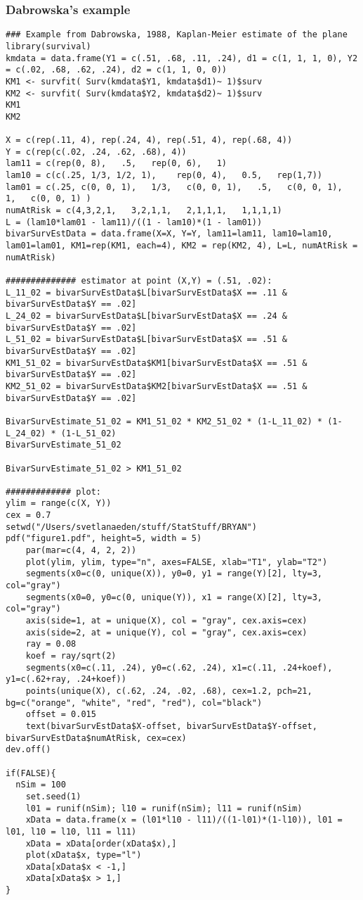 \documentclass[]{article}
\begin{document}
\subsubsection{Dabrowska's example}
{{\tiny
\begin{verbatim}
### Example from Dabrowska, 1988, Kaplan-Meier estimate of the plane
library(survival)
kmdata = data.frame(Y1 = c(.51, .68, .11, .24), d1 = c(1, 1, 1, 0), Y2 = c(.02, .68, .62, .24), d2 = c(1, 1, 0, 0))
KM1 <- survfit( Surv(kmdata$Y1, kmdata$d1)~ 1)$surv
KM2 <- survfit( Surv(kmdata$Y2, kmdata$d2)~ 1)$surv
KM1
KM2

X = c(rep(.11, 4), rep(.24, 4), rep(.51, 4), rep(.68, 4))
Y = c(rep(c(.02, .24, .62, .68), 4))
lam11 = c(rep(0, 8),   .5,   rep(0, 6),   1)
lam10 = c(c(.25, 1/3, 1/2, 1),    rep(0, 4),   0.5,   rep(1,7))
lam01 = c(.25, c(0, 0, 1),   1/3,   c(0, 0, 1),   .5,   c(0, 0, 1),   1,   c(0, 0, 1) )
numAtRisk = c(4,3,2,1,   3,2,1,1,   2,1,1,1,   1,1,1,1)
L = (lam10*lam01 - lam11)/((1 - lam10)*(1 - lam01))
bivarSurvEstData = data.frame(X=X, Y=Y, lam11=lam11, lam10=lam10, lam01=lam01, KM1=rep(KM1, each=4), KM2 = rep(KM2, 4), L=L, numAtRisk = numAtRisk)

############## estimator at point (X,Y) = (.51, .02):
L_11_02 = bivarSurvEstData$L[bivarSurvEstData$X == .11 & bivarSurvEstData$Y == .02]
L_24_02 = bivarSurvEstData$L[bivarSurvEstData$X == .24 & bivarSurvEstData$Y == .02]
L_51_02 = bivarSurvEstData$L[bivarSurvEstData$X == .51 & bivarSurvEstData$Y == .02]
KM1_51_02 = bivarSurvEstData$KM1[bivarSurvEstData$X == .51 & bivarSurvEstData$Y == .02]
KM2_51_02 = bivarSurvEstData$KM2[bivarSurvEstData$X == .51 & bivarSurvEstData$Y == .02]

BivarSurvEstimate_51_02 = KM1_51_02 * KM2_51_02 * (1-L_11_02) * (1-L_24_02) * (1-L_51_02)
BivarSurvEstimate_51_02

BivarSurvEstimate_51_02 > KM1_51_02

############# plot:
ylim = range(c(X, Y))
cex = 0.7
setwd("/Users/svetlanaeden/stuff/StatStuff/BRYAN")
pdf("figure1.pdf", height=5, width = 5)
	par(mar=c(4, 4, 2, 2))
	plot(ylim, ylim, type="n", axes=FALSE, xlab="T1", ylab="T2")
	segments(x0=c(0, unique(X)), y0=0, y1 = range(Y)[2], lty=3, col="gray")
	segments(x0=0, y0=c(0, unique(Y)), x1 = range(X)[2], lty=3, col="gray")
	axis(side=1, at = unique(X), col = "gray", cex.axis=cex)
	axis(side=2, at = unique(Y), col = "gray", cex.axis=cex)
	ray = 0.08
	koef = ray/sqrt(2)
	segments(x0=c(.11, .24), y0=c(.62, .24), x1=c(.11, .24+koef), y1=c(.62+ray, .24+koef))
	points(unique(X), c(.62, .24, .02, .68), cex=1.2, pch=21, bg=c("orange", "white", "red", "red"), col="black")
	offset = 0.015
	text(bivarSurvEstData$X-offset, bivarSurvEstData$Y-offset, bivarSurvEstData$numAtRisk, cex=cex)
dev.off()

if(FALSE){
  nSim = 100
	set.seed(1)
	l01 = runif(nSim); l10 = runif(nSim); l11 = runif(nSim) 
	xData = data.frame(x = (l01*l10 - l11)/((1-l01)*(1-l10)), l01 = l01, l10 = l10, l11 = l11)
	xData = xData[order(xData$x),]
	plot(xData$x, type="l")
	xData[xData$x < -1,]
	xData[xData$x > 1,]
}


\end{verbatim}
}}
\end{document}
